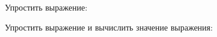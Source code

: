 \begin{enumcols}[label=\textbf{\arabic*.}]
	\item {}
	\item Упростить выражение:
	\begin{enumcols}[itemcolumns=1]
		\item {}
		\item {}
		\item {}
		\item {}
		\item {}
		\item {}
	\end{enumcols}
	\item Упростить выражение и вычислить значение выражения:
	\begin{enumcols}[itemcolumns=1]
		\item {}
		\item {}
		\item {}
	\end{enumcols}
	\item {}
	\item {}
	\item {}
\end{enumcols}